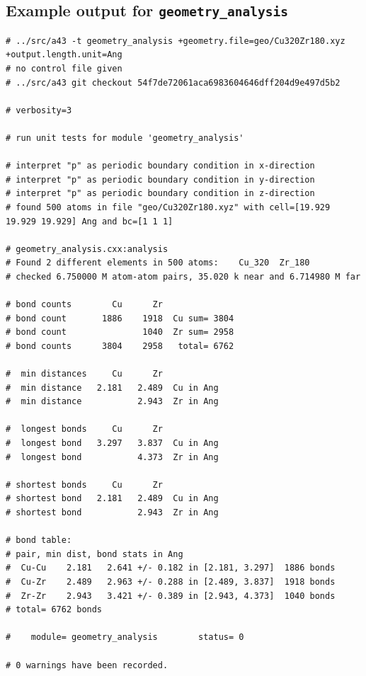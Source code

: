 \documentclass[oribibl]{llncs}
\newcommand{\ttt}[1]{\texttt{#1}}
\begin{document}
\newpage

\subsection{Example output for \ttt{geometry\_analysis}} \label{sec:example-output-for-geometry-analysis}
\small
\begin{verbatim}
# ../src/a43 -t geometry_analysis +geometry.file=geo/Cu320Zr180.xyz +output.length.unit=Ang
# no control file given
# ../src/a43 git checkout 54f7de72061aca6983604646dff204d9e497d5b2

# verbosity=3

# run unit tests for module 'geometry_analysis'

# interpret "p" as periodic boundary condition in x-direction
# interpret "p" as periodic boundary condition in y-direction
# interpret "p" as periodic boundary condition in z-direction
# found 500 atoms in file "geo/Cu320Zr180.xyz" with cell=[19.929 19.929 19.929] Ang and bc=[1 1 1]

# geometry_analysis.cxx:analysis
# Found 2 different elements in 500 atoms:    Cu_320  Zr_180
# checked 6.750000 M atom-atom pairs, 35.020 k near and 6.714980 M far

# bond counts        Cu      Zr
# bond count       1886    1918  Cu sum= 3804
# bond count               1040  Zr sum= 2958
# bond counts      3804    2958   total= 6762

#  min distances     Cu      Zr
#  min distance   2.181   2.489  Cu in Ang
#  min distance           2.943  Zr in Ang

#  longest bonds     Cu      Zr
#  longest bond   3.297   3.837  Cu in Ang
#  longest bond           4.373  Zr in Ang

# shortest bonds     Cu      Zr
# shortest bond   2.181   2.489  Cu in Ang
# shortest bond           2.943  Zr in Ang

# bond table:
# pair, min dist, bond stats in Ang
#  Cu-Cu    2.181   2.641 +/- 0.182 in [2.181, 3.297]  1886 bonds
#  Cu-Zr    2.489   2.963 +/- 0.288 in [2.489, 3.837]  1918 bonds
#  Zr-Zr    2.943   3.421 +/- 0.389 in [2.943, 4.373]  1040 bonds
# total= 6762 bonds

#    module= geometry_analysis        status= 0

# 0 warnings have been recorded.
\end{verbatim}
\normalsize
\end{document}
